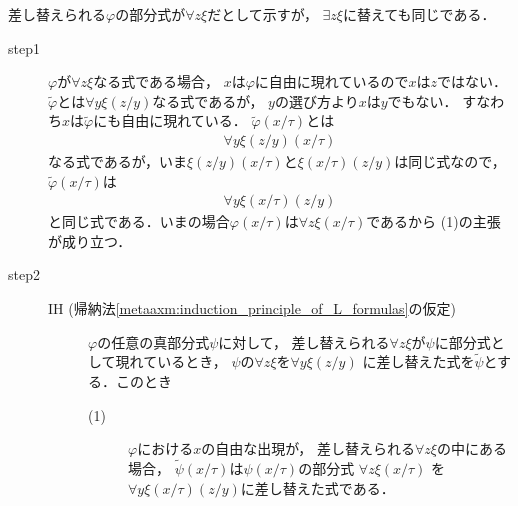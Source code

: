 	\begin{metaprf} 差し替えられる$\varphi$の部分式が$\forall z \xi$だとして示すが，
		$\exists z \xi$に替えても同じである．
		\begin{description}
			\item[step1] $\varphi$が$\forall z \xi$なる式である場合，
				$x$は$\varphi$に自由に現れているので$x$は$z$ではない．
				$\widetilde{\varphi}$とは$\forall y \xi(z/y)$なる式であるが，
				$y$の選び方より$x$は$y$でもない．
				すなわち$x$は$\widetilde{\varphi}$にも自由に現れている．
				$\widetilde{\varphi}(x/\tau)$とは
				\begin{align}
					\forall y \xi(z/y)(x/\tau)
				\end{align}
				なる式であるが，いま$\xi(z/y)(x/\tau)$と$\xi(x/\tau)(z/y)$は同じ式なので，
				$\widetilde{\varphi}(x/\tau)$は
				\begin{align}
					\forall y \xi(x/\tau)(z/y)
				\end{align}
				と同じ式である．いまの場合$\varphi(x/\tau)$は$\forall z \xi(x/\tau)$であるから
				(1)の主張が成り立つ．
				
			\item[step2]\mbox{}
				\begin{description}
					\item[IH (帰納法\ref{metaaxm:induction_principle_of_L_formulas}の仮定)]
						$\varphi$の任意の真部分式$\psi$に対して，
						差し替えられる$\forall z \xi$が$\psi$に部分式として現れているとき，
						$\psi$の$\forall z \xi$を$\forall y \xi(z/y)$ 
						に差し替えた式を$\widetilde{\psi}$とする．このとき
						\begin{description}
							\item[(1)] $\varphi$における$x$の自由な出現が，
								差し替えられる$\forall z \xi$の中にある場合，
								$\widetilde{\psi}(x/\tau)$は$\psi(x/\tau)$の部分式
								$\forall z \xi(x/\tau)$ 
								を$\forall y \xi(x/\tau)(z/y)$に差し替えた式である．
						

\end{description}
\end{description}
\end{description}
\end{metaprf}
